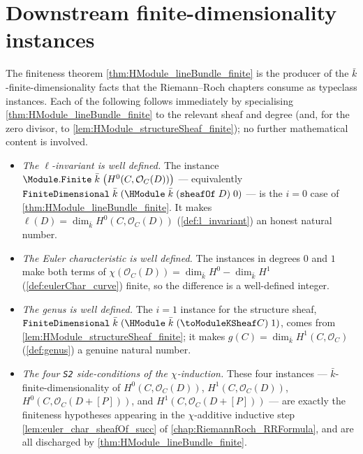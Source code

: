 \section{Downstream finite-dimensionality instances}
\label{sec:SerreFiniteness_instances}

The finiteness theorem \cref{thm:HModule_lineBundle_finite} is the
producer of the \(\bar k\)-finite-dimensionality facts that the
Riemann--Roch chapters consume as typeclass instances. Each of the
following follows immediately by specialising
\cref{thm:HModule_lineBundle_finite} to the relevant sheaf and degree
(and, for the zero divisor, to \cref{lem:HModule_structureSheaf_finite});
no further mathematical content is involved.

\begin{itemize}
  \item \emph{The \(\ell\)-invariant is well defined.} The instance
    \(\Module.\mathtt{Finite}\;\bar k\;\bigl(H^0(C, \mathcal O_C(D))\bigr)\)
    --- equivalently
    \(\mathtt{FiniteDimensional}\;\bar k\;(\HModule\;\bar k\;
    (\mathtt{sheafOf}\;D)\;0)\) --- is the \(i = 0\) case of
    \cref{thm:HModule_lineBundle_finite}. It makes
    \(\ell(D) = \dim_{\bar k} H^0(C, \mathcal O_C(D))\)
    (\cref{def:l_invariant}) an honest natural number.
  \item \emph{The Euler characteristic is well defined.} The instances
    in degrees \(0\) and \(1\) make both terms of
    \(\chi(\mathcal O_C(D)) = \dim_{\bar k} H^0 - \dim_{\bar k} H^1\)
    (\cref{def:eulerChar_curve}) finite, so the difference is a
    well-defined integer.
  \item \emph{The genus is well defined.} The \(i = 1\) instance for the
    structure sheaf, \(\mathtt{FiniteDimensional}\;\bar k\;
    (\HModule\;\bar k\;(\toModuleKSheaf C)\;1)\), comes from
    \cref{lem:HModule_structureSheaf_finite}; it makes
    \(g(C) = \dim_{\bar k} H^1(C, \mathcal O_C)\) (\cref{def:genus}) a
    genuine natural number.
  \item \emph{The four \texttt{S2} side-conditions of the
    \(\chi\)-induction.} These four instances ---
    \(\bar k\)-finite-dimensionality of
    \(H^0(C, \mathcal O_C(D))\), \(H^1(C, \mathcal O_C(D))\),
    \(H^0(C, \mathcal O_C(D + [P]))\), and
    \(H^1(C, \mathcal O_C(D + [P]))\) --- are exactly the finiteness
    hypotheses appearing in the \(\chi\)-additive inductive step
    \cref{lem:euler_char_sheafOf_succ} of
    \cref{chap:RiemannRoch_RRFormula}, and are all discharged by
    \cref{thm:HModule_lineBundle_finite}.
\end{itemize}

